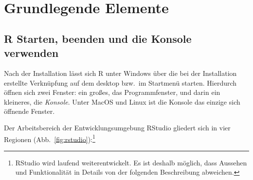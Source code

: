 \section{Grundlegende Elemente}

\subsection{R Starten, beenden und die Konsole verwenden}
\label{sec:console}

Nach der Installation lässt sich R unter Windows über die bei der Installation erstellte Verknüpfung auf dem desktop bzw.\ im Startmenü starten. Hierdurch öffnen sich zwei Fenster: ein großes, das Programmfenster, und darin ein kleineres, die \emph{Konsole}. Unter MacOS und Linux ist die Konsole das einzige sich öffnende Fenster.

Der Arbeitsbereich der Entwicklungsumgebung RStudio gliedert sich in vier Regionen (Abb.\ \ref{fig:rstudio}):\footnote{RStudio wird laufend weiterentwickelt. Es ist deshalb möglich, dass Aussehen und Funktionalität in Details von der folgenden Beschreibung abweichen.}

